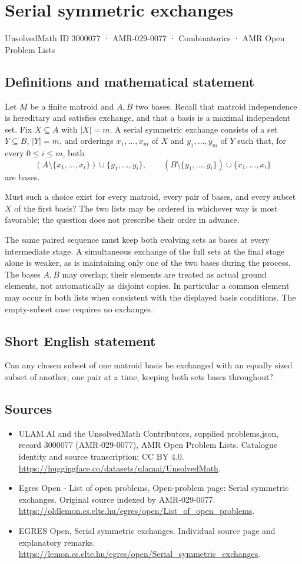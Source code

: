 \documentclass[11pt,a4paper]{article}
\begin{document}
\section*{Serial symmetric exchanges}\label{3000077}
{\small UnsolvedMath ID 3000077 · AMR-029-0077 · Combinatorics · AMR Open Problem Lists}
\subsection{Definitions and mathematical statement}
Let $M$ be a finite matroid and $A,B$ two bases. Recall that
matroid independence is hereditary and satisfies exchange, and
that a basis is a maximal independent set. Fix $X\subseteq A$
with $|X|=m$. A serial symmetric exchange consists of a set
$Y\subseteq B$, $|Y|=m$, and orderings $x_1,\ldots,x_m$ of $X$
and $y_1,\ldots,y_m$ of $Y$ such that, for every $0\le i\le m$,
both
\[
 (A\setminus\{x_1,\ldots,x_i\})\cup\{y_1,\ldots,y_i\},
 \qquad
 (B\setminus\{y_1,\ldots,y_i\})\cup\{x_1,\ldots,x_i\}
\]
are bases.

Must such a choice exist for every matroid, every pair of bases,
and every subset $X$ of the first basis?
The two lists may be ordered in whichever way is most favorable;
the question does not prescribe their order in advance.

The same paired sequence must keep both evolving sets as bases
at every intermediate stage. A simultaneous exchange of the full
sets at the final stage alone is weaker, as is maintaining only
one of the two bases during the process. The bases $A,B$ may
overlap; their elements are treated as actual ground elements,
not automatically as disjoint copies. In particular a common
element may occur in both lists when consistent with the displayed
basis conditions. The empty-subset case requires no exchanges.
\subsection{Short English statement}
Can any chosen subset of one matroid basis be exchanged with
an equally sized subset of another, one pair at a time, keeping both sets bases throughout?
\subsection{Sources}
\begin{itemize}
\item[S1] ULAM.AI and the UnsolvedMath Contributors, supplied problems.json, record 3000077 (AMR-029-0077), AMR Open Problem Lists. Catalogue identity and source transcription; CC BY 4.0.
\url{https://huggingface.co/datasets/ulamai/UnsolvedMath}.
\item[S2] Egres Open - List of open problems, Open-problem page: Serial symmetric exchanges. Original source indexed by AMR-029-0077.
\url{https://oldlemon.cs.elte.hu/egres/open/List_of_open_problems}.
\item[S3] EGRES Open, Serial symmetric exchanges. Individual source page and explanatory remarks.
\url{https://lemon.cs.elte.hu/egres/open/Serial_symmetric_exchanges}.
\end{itemize}
\end{document}
